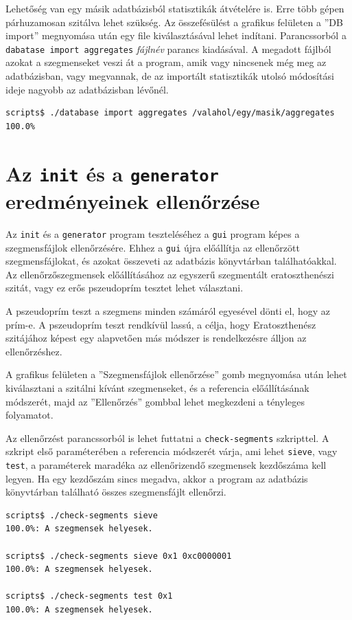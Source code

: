 Lehetőség van egy másik adatbázisból statisztikák átvételére is.
Erre több gépen párhuzamosan szitálva lehet szükség.
Az összefésülést a grafikus felületen a ''DB import'' megnyomása után egy file kiválasztásával lehet indítani.
Parancssorból a \texttt{dabatase import aggregates} \textit{fájlnév} parancs kiadásával.
A megadott fájlból azokat a szegmenseket veszi át a program, amik vagy nincsenek még meg az adatbázisban, vagy megvannak, de az importált statisztikák utolsó módosítási ideje nagyobb az adatbázisban lévőnél.

\begin{lstlisting}[language=bash]
scripts$ ./database import aggregates /valahol/egy/masik/aggregates
100.0%
\end{lstlisting}

\section{Az \texttt{init} és a \texttt{generator} eredményeinek ellenőrzése}

Az \texttt{init} és a \texttt{generator} program teszteléséhez a \texttt{gui} program képes a szegmensfájlok ellenőrzésére.
Ehhez a \texttt{gui} újra előállítja az ellenőrzött szegmensfájlokat, és azokat összeveti az adatbázis könyvtárban találhatóakkal.
Az ellenőrzőszegmensek előállításához az egyszerű szegmentált eratoszthenészi szitát, vagy ez erős pszeudoprím tesztet lehet választani.

A pszeudoprím teszt a szegmens minden számáról egyesével dönti el, hogy az prím-e.
A pszeudoprím teszt rendkívül lassú, a célja, hogy Eratoszthenész szitájához képest egy alapvetően más módszer is rendelkezésre álljon az ellenőrzéshez.

A grafikus felületen a ''Szegmensfájlok ellenőrzése'' gomb megnyomása után lehet kiválasztani a szitálni kívánt szegmenseket, és a referencia előállításának módszerét, majd az ''Ellenőrzés'' gombbal lehet megkezdeni a tényleges folyamatot.

Az ellenőrzést parancssorból is lehet futtatni a \texttt{check-segments} szkripttel.
A szkript első paraméterében a referencia módszerét várja, ami lehet \texttt{sieve}, vagy \texttt{test}, a paraméterek maradéka az ellenőrizendő szegmensek kezdőszáma kell legyen.
Ha egy kezdőszám sincs megadva, akkor a program az adatbázis könyvtárban található összes szegmensfájlt ellenőrzi.

\begin{lstlisting}[language=bash]
scripts$ ./check-segments sieve
100.0%: A szegmensek helyesek.             

scripts$ ./check-segments sieve 0x1 0xc0000001
100.0%: A szegmensek helyesek.             

scripts$ ./check-segments test 0x1
100.0%: A szegmensek helyesek.             

\end{lstlisting}

